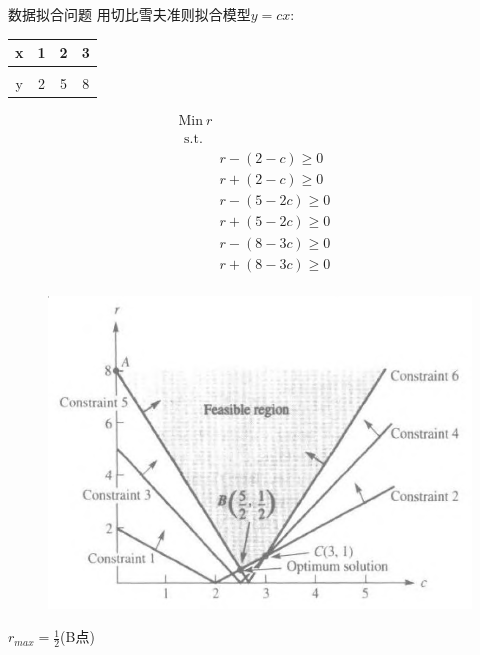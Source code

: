 \documentclass[UTF8]{ctexbeamer}
\begin{document}
\begin{frame}{数据拟合问题}
  用切比雪夫准则拟合模型$y=cx$:\quad{}
  \begin{tabular}{c|ccc}
    x & 1 & 2 & 3\\
    \hline\\[-20pt]
    y & 2 & 5 & 8
  \end{tabular}

  \begin{figure}
    \begin{minipage}{.5\linewidth}
    \[ 
    \begin{array}{c}
      \mbox{Min}\ r\\
      \begin{array}{ll}
        \mbox{s.t.} & \\
        &
        \begin{array}{r}
          r - (2 - c) \ge 0 \\
          r + (2 - c) \ge 0 \\
          r - (5 -2c) \ge 0 \\
          r + (5 - 2c) \ge 0 \\
          r - (8 - 3c) \ge 0 \\
          r + (8 - 3c) \ge 0
        \end{array}
      \end{array}
    \end{array}
    \]
    \end{minipage}%
    \begin{minipage}{.5\linewidth}
      \includegraphics[width=\textwidth{}]{datafit.png}
    \end{minipage}
  \end{figure}
  
  $r_{max} = \frac{1}{2}$(B点)
  
\end{frame}
\end{document}
